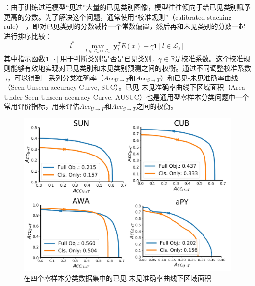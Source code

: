 \textbf{}：由于训练过程模型“见过”大量的已见类别图像，模型往往倾向于给已见类别赋予更高的分数。为了解决这个问题，通常使用“校准规则”（calibrated stacking rule）~\cite{chao2016empirical}，即对已见类别的分数减掉一个常数偏置，然后再和未见类别的分数一起进行排序比较：
\begin{equation} \label{ch3:eq:eq_8}
    l^* = \max_{l\in \mathcal{L}_u \cup \mathcal{L}_s }~\bm{y}^T_l E(x) - \gamma \mathbf{1} \left[ l \in \mathcal{L}_s \right]
\end{equation}
其中指示函数$\mathbf{1} \left[ \cdot \right]$用于判断类别$l$是否是已见类别，$\gamma \in \mathbb{R}$是校准系数。这个校准规则能够有效地实现对已见类别和未见类别预测之间的权衡。通过不同调整校准系数$\gamma$，可以得到一系列分类准确率（$Acc_{U \to T}$和$Acc_{S \to T}$）和已见-未见准确率曲线（Seen-Unseen accuracy Curve, SUC）。已见-未见准确率曲线下区域面积（Area Under Seen-Unseen accuracy Curve, AUSUC）也是通用型零样本分类问题中一个常用评价指标，用来评估$Acc_{U \to T}$和$Acc_{S \to T}$之间的权衡。

\begin{figure}[ht]
    \centering
    \includegraphics[width=0.7\linewidth]{chapter3/res/ausuc.pdf}
    \caption{在四个零样本分类数据集中的已见-未见准确率曲线下区域面积}
\label{ch3:fig:ausuc}
\end{figure}


